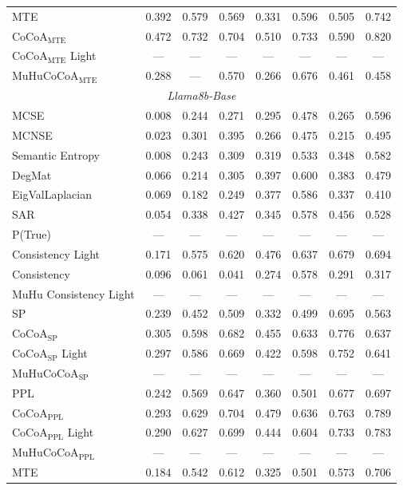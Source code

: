 \documentclass[11pt]{article}
\newcommand{\method}{MuHuCoCoA}
\begin{document}
\begin{table}[htbp]
{\begin{tabular}{l ccccccc}
MTE & 0.392 & 0.579 & 0.569 & 0.331 & 0.596 & 0.505 & 0.742 \\
CoCoA$_{\mathrm{MTE}}$ & 0.472 & 0.732 & 0.704 & 0.510 & 0.733 & 0.590 & 0.820 \\
CoCoA$_{\mathrm{MTE}}$ Light & --- & --- & --- & --- & --- & --- & --- \\
\method{}$_{\mathrm{MTE}}$ & 0.288 & --- & 0.570 & 0.266 & 0.676 & 0.461 & 0.458 \\
\midrule
\multicolumn{8}{c}{\textit{Llama8b-Base}} \\
\midrule
MCSE & 0.008 & 0.244 & 0.271 & 0.295 & 0.478 & 0.265 & 0.596 \\
MCNSE & 0.023 & 0.301 & 0.395 & 0.266 & 0.475 & 0.215 & 0.495 \\
Semantic Entropy & 0.008 & 0.243 & 0.309 & 0.319 & 0.533 & 0.348 & 0.582 \\
DegMat & 0.066 & 0.214 & 0.305 & 0.397 & 0.600 & 0.383 & 0.479 \\
EigValLaplacian & 0.069 & 0.182 & 0.249 & 0.377 & 0.586 & 0.337 & 0.410 \\
SAR & 0.054 & 0.338 & 0.427 & 0.345 & 0.578 & 0.456 & 0.528 \\
P(True) & --- & --- & --- & --- & --- & --- & --- \\
Consistency Light & 0.171 & 0.575 & 0.620 & 0.476 & 0.637 & 0.679 & 0.694 \\
Consistency & 0.096 & 0.061 & 0.041 & 0.274 & 0.578 & 0.291 & 0.317 \\
MuHu Consistency Light & --- & --- & --- & --- & --- & --- & --- \\
SP & 0.239 & 0.452 & 0.509 & 0.332 & 0.499 & 0.695 & 0.563 \\
CoCoA$_{\mathrm{SP}}$ & 0.305 & 0.598 & 0.682 & 0.455 & 0.633 & 0.776 & 0.637 \\
CoCoA$_{\mathrm{SP}}$ Light & 0.297 & 0.586 & 0.669 & 0.422 & 0.598 & 0.752 & 0.641 \\
\method{}$_{\mathrm{SP}}$ & --- & --- & --- & --- & --- & --- & --- \\
PPL & 0.242 & 0.569 & 0.647 & 0.360 & 0.501 & 0.677 & 0.697 \\
CoCoA$_{\mathrm{PPL}}$ & 0.293 & 0.629 & 0.704 & 0.479 & 0.636 & 0.763 & 0.789 \\
CoCoA$_{\mathrm{PPL}}$ Light & 0.290 & 0.627 & 0.699 & 0.444 & 0.604 & 0.733 & 0.783 \\
\method{}$_{\mathrm{PPL}}$ & --- & --- & --- & --- & --- & --- & --- \\
MTE & 0.184 & 0.542 & 0.612 & 0.325 & 0.501 & 0.573 & 0.706 \\

\end{tabular}}
\end{table}
\end{document}
